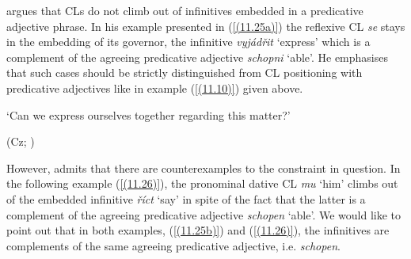 \citet[75]{Junghanns02} argues that CLs do not climb out of infinitives embedded in a predicative adjective phrase. In his example presented in (\ref{(11.25a)}) the reflexive CL \textit{se} stays in the embedding of its governor, the infinitive \textit{vyjádřit} ‘express’ which is a complement of the agreeing predicative adjective \textit{schopni} ‘able’. He emphasises that such cases should be strictly distinguished from CL positioning with predicative adjectives like in example (\ref{(11.10)}) given above.

\begin{exe}\ex
\begin{xlist}
\end{xlist}
\glt ‘Can we express ourselves together regarding this matter?’ \\
\strut\hfill (Cz; \citealt[75]{Junghanns02})
\end{exe}

\noindent However, \citet[76]{Junghanns02} admits that there are counterexamples to the constraint in question. In the following example (\ref{(11.26)}), the pronominal dative CL \textit{mu} ‘him’ climbs out of the embedded infinitive \textit{říct} ‘say’ in spite of the fact that the latter is a complement of the agreeing predicative adjective \textit{schopen} ‘able’. We would like to point out that in both examples, (\ref{(11.25b)}) and (\ref{(11.26)}), the infinitives are complements of the same agreeing predicative adjective, i.e. \textit{schopen}.


